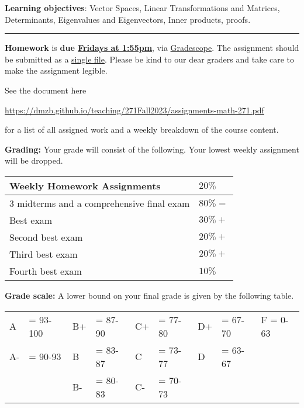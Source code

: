 \documentclass[12pt]{article}
\begin{document}
\noindent \textbf{Learning objectives}: Vector Spaces, Linear Transformations and Matrices, Determinants, Eigenvalues and Eigenvectors, Inner products, proofs.

\medskip
 \hrule
\medskip

\noindent \textbf{Homework} is \textbf{due \underline{Fridays at 1:55pm}}, via \underline{Gradescope}. The assignment should be submitted as a \underline{single file}. Please be kind to our dear graders and take care to make the assignment legible.
\smallskip

\noindent See the document here
\begin{center}
  \url{https://dmzb.github.io/teaching/271Fall2023/assignments-math-271.pdf}
\end{center}
for a list of all assigned work and a weekly breakdown of the course content.
\medskip

\noindent\textbf{Grading:} 
Your grade will consist of the following. Your lowest weekly assignment will be dropped.

\begin{center}
  \begin{tabular}{|l|l|}
    \hline
    Weekly Homework Assignments & $20\%$ \\
    \hline    
    3 midterms and a comprehensive final exam  & $80\% = $   	 \\
    Best exam  & $30\% + $ 	 \\
    Second best exam& $20\% + $ 	 \\
    Third best exam & $20\% + $ 	 \\
    Fourth best exam & $10\%$ 	 \\ 
    \hline
  \end{tabular}
\end{center}

\vspace*{.15in}
\noindent\textbf{Grade scale:} 
A lower bound on your final grade is given by the following table. 

\begin{center}
  \begin{tabular}{|ll|ll|ll|ll|l|}
\hline
A  &\hspace{-3 pt}\hspace{-7 pt}= 93-100   &B+ &\hspace{-7 pt}= 87-90  &C+ &\hspace{-7 pt}= 77-80 & D+ &\hspace{-7 pt}= 67-70  & F = 0-63\\
A- &\hspace{-3 pt}\hspace{-7 pt}= 90-93    &B  &\hspace{-7 pt}= 83-87  & C &\hspace{-7 pt}= 73-77  & D  &\hspace{-7 pt}= 63-67 &\\
   &                         &B- &\hspace{-7 pt}= 80-83  &C- &\hspace{-7 pt}= 70-73 &    &        &\\
    \hline
  \end{tabular}
\end{center}
\end{document}
